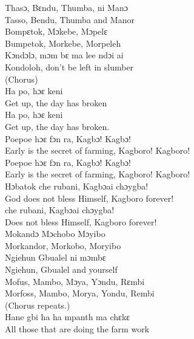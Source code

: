 Thasɔ, Bɛndu, Thumba, ni Manɔ\\
Tasso, Bendu, Thumba and Manor\\

Bompɛtok, Mɔkebe, Mɔpelɛ\\
Bumpetok, Morkebe, Morpeleh\\

Kɔndɔlɔ, mɔm bɛ ma lee ndɔi ai\\
Kondoloh, don't be left in slumber\\

(Chorus)\\

Ha po, hɔɛ keni\\
Get up, the day has broken\\

Ha po, hɔɛ keni\\
Get up, the day has broken.\\

Poepoe hɔɛ fɔn ra, Kagbɔ! Kagbɔ!\\
Early is the secret of farming, Kagboro! Kagboro!\\

Poepoe hɔɛ fɔn ra, Kagbɔ! Kagbɔ!\\
Early is the secret of farming, Kagboro! Kagboro!\\

Hɔbatok che rubani, Kagbɔai chɔygba!\\
God does not bless Himself, Kagboro forever!\\

che rubani, Kagbɔai chɔygba!\\
Does not bless Himself, Kagboro forever!\\

Mokandɔ Mɔchobo Mɔyibo\\
Morkandor, Morkobo, Moryibo\\

Ngiehun Gbualel ni mɔmbɛ\\
Ngiehun, Gbualel and yourself\\

Mofus, Mambo, Mɔya, Yɔndu, Rɛmbi\\
Morfoss, Mambo, Morya, Yondu, Rembi\\

(Chorus repeats.)\\

Hane gbi ha ha mpanth ma chɛkɛ\\
All those that are doing the farm work\\

